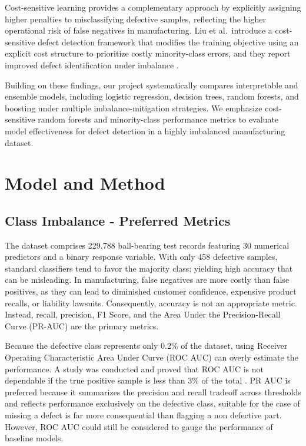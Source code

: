 \documentclass{article}
\begin{document}
Cost-sensitive learning provides a complementary approach by explicitly assigning higher penalties to misclassifying defective samples, reflecting the higher operational risk of false negatives in manufacturing. Liu et al.\ introduce a cost-sensitive defect detection framework that modifies the training objective using an explicit cost structure to prioritize costly minority-class errors, and they report improved defect identification under imbalance \cite{liu2023costsensitiveyolov5}.

Building on these findings, our project systematically compares interpretable and ensemble models, including logistic regression, decision trees, random forests, and boosting under multiple imbalance-mitigation strategies. We emphasize cost-sensitive random forests and minority-class performance metrics to evaluate model effectiveness for defect detection in a highly imbalanced manufacturing dataset.



\section{Model and Method}
 
\subsection*{Class Imbalance - Preferred Metrics}
The dataset comprises 229,788 ball-bearing test records featuring 30 numerical predictors and a binary response variable. With only 458 defective samples, standard classifiers tend to favor the majority class; yielding high accuracy that can be misleading. In manufacturing, false negatives are more costly than false positives, as they can lead to diminished customer confidence, expensive product recalls, or liability lawsuits. Consequently, accuracy is not an appropriate metric. Instead, recall, precision, F1 Score, and the Area Under the Precision-Recall Curve (PR-AUC) are the primary metrics.
 
Because the defective class represents only 0.2\% of the dataset, using Receiver Operating Characteristic Area Under Curve (ROC AUC) can overly estimate the performance. A study was conducted and proved that ROC AUC is not dependable if the true positive sample is less than 3\% of the total \cite{imani2026roc}. PR AUC is preferred because it summarizes the precision and recall tradeoff across thresholds and reflects performance exclusively on the defective class, suitable for the case of missing a defect is far more consequential than flagging a non defective part. However, ROC AUC could still be considered to gauge the performance of baseline models.
 
\end{document}
